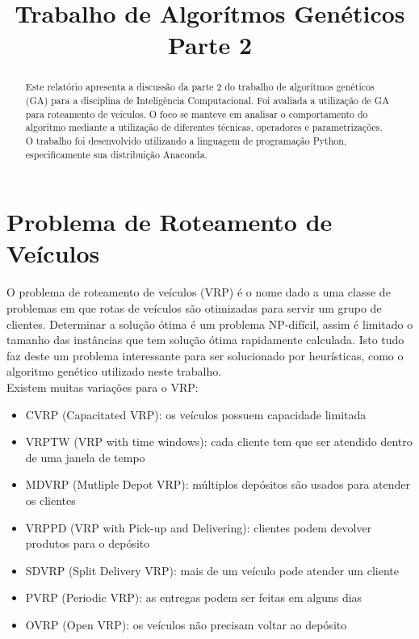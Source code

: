 \documentclass[conference]{IEEEtran}
\begin{document}
\title{Trabalho de Algorítmos Genéticos\\ Parte 2}


\author{
}

\maketitle

\begin{abstract}
Este relatório apresenta a discussão da parte 2  do trabalho de algorítmos
genéticos (GA) para a disciplina de Inteligência Computacional. Foi avaliada a
utilização de GA para roteamento de veículos. O foco se manteve em
analisar o comportamento do algorítmo mediante a utilização de
diferentes técnicas, operadores e parametrizações.\\
O trabalho foi desenvolvido utilizando a linguagem de programação Python,
especificamente sua distribuição Anaconda.\\
\end{abstract}


\section{Problema de Roteamento de Veículos}
O problema de roteamento de veículos (VRP) é o nome dado a uma classe de problemas em que rotas de veículos são otimizadas para servir um grupo de clientes. Determinar a solução ótima é um problema NP-difícil, assim é limitado o tamanho das instâncias que tem solução ótima rapidamente calculada. Isto tudo faz deste um problema interessante para ser solucionado por heurísticas, como o algoritmo genético utilizado neste trabalho.\\

Existem muitas variações para o VRP:
\begin{itemize}
\item CVRP (Capacitated VRP): os veículos possuem capacidade limitada
\item VRPTW (VRP with time windows): cada cliente tem que ser atendido dentro de uma janela de tempo
\item MDVRP (Mutliple Depot VRP): múltiplos depósitos são usados para atender os clientes
\item VRPPD (VRP with Pick-up and Delivering): clientes podem devolver produtos para o depósito
\item SDVRP (Split Delivery VRP): mais de um veículo pode atender um cliente
\item PVRP (Periodic VRP): as entregas podem ser feitas em alguns dias
\item OVRP (Open VRP): os veículos não precisam voltar ao depósito
\end{itemize}
\end{document}
